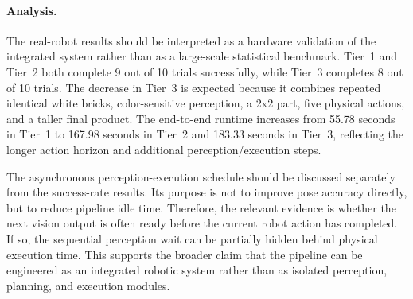 \paragraph{Analysis.}
The real-robot results should be interpreted as a hardware validation of the integrated system
rather than as a large-scale statistical benchmark. Tier~1 and Tier~2 both complete 9 out of
10 trials successfully, while Tier~3 completes 8 out of 10 trials. The decrease in Tier~3 is
expected because it combines repeated identical white bricks, color-sensitive perception, a
2x2 part, five physical actions, and a taller final product. The end-to-end runtime increases
from 55.78 seconds in Tier~1 to 167.98 seconds in Tier~2 and 183.33 seconds in Tier~3,
reflecting the longer action horizon and additional perception/execution steps.

The asynchronous perception-execution schedule should be discussed separately from the
success-rate results. Its purpose is not to improve pose accuracy directly, but to reduce
pipeline idle time. Therefore, the relevant evidence is whether the next vision output is often
ready before the current robot action has completed. If so, the sequential perception wait can
be partially hidden behind physical execution time. This supports the broader claim that the
pipeline can be engineered as an integrated robotic system rather than as isolated perception,
planning, and execution modules.
